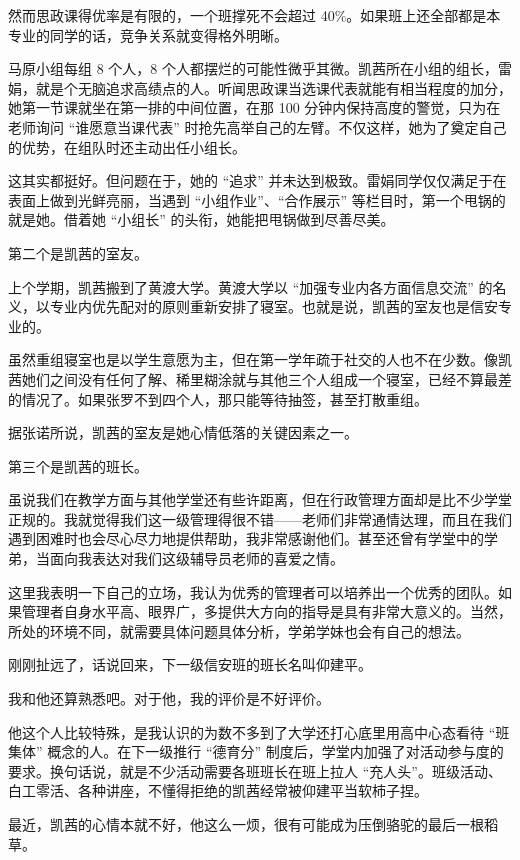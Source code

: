 \documentclass[UTF8]{ctexart}
\begin{document}
然而思政课得优率是有限的，一个班撑死不会超过 40\%。如果班上还全部都是本专业的同学的话，竞争关系就变得格外明晰。

马原小组每组 8 个人，8 个人都摆烂的可能性微乎其微。凯茜所在小组的组长，雷娟，就是个无脑追求高绩点的人。听闻思政课当选课代表就能有相当程度的加分，她第一节课就坐在第一排的中间位置，在那 100 分钟内保持高度的警觉，只为在老师询问 “谁愿意当课代表” 时抢先高举自己的左臂。不仅这样，她为了奠定自己的优势，在组队时还主动出任小组长。

这其实都挺好。但问题在于，她的 “追求” 并未达到极致。雷娟同学仅仅满足于在表面上做到光鲜亮丽，当遇到 “小组作业”、“合作展示” 等栏目时，第一个甩锅的就是她。借着她 “小组长” 的头衔，她能把甩锅做到尽善尽美。

第二个是凯茜的室友。

上个学期，凯茜搬到了黄渡大学。黄渡大学以 “加强专业内各方面信息交流” 的名义，以专业内优先配对的原则重新安排了寝室。也就是说，凯茜的室友也是信安专业的。

虽然重组寝室也是以学生意愿为主，但在第一学年疏于社交的人也不在少数。像凯茜她们之间没有任何了解、稀里糊涂就与其他三个人组成一个寝室，已经不算最差的情况了。如果张罗不到四个人，那只能等待抽签，甚至打散重组。

据张诺所说，凯茜的室友是她心情低落的关键因素之一。

第三个是凯茜的班长。

虽说我们在教学方面与其他学堂还有些许距离，但在行政管理方面却是比不少学堂正规的。我就觉得我们这一级管理得很不错——老师们非常通情达理，而且在我们遇到困难时也会尽心尽力地提供帮助，我非常感谢他们。甚至还曾有学堂中的学弟，当面向我表达对我们这级辅导员老师的喜爱之情。

这里我表明一下自己的立场，我认为优秀的管理者可以培养出一个优秀的团队。如果管理者自身水平高、眼界广，多提供大方向的指导是具有非常大意义的。当然，所处的环境不同，就需要具体问题具体分析，学弟学妹也会有自己的想法。

刚刚扯远了，话说回来，下一级信安班的班长名叫仰建平。

我和他还算熟悉吧。对于他，我的评价是不好评价。

他这个人比较特殊，是我认识的为数不多到了大学还打心底里用高中心态看待 “班集体” 概念的人。在下一级推行 “德育分” 制度后，学堂内加强了对活动参与度的要求。换句话说，就是不少活动需要各班班长在班上拉人 “充人头”。班级活动、白工零活、各种讲座，不懂得拒绝的凯茜经常被仰建平当软柿子捏。

最近，凯茜的心情本就不好，他这么一烦，很有可能成为压倒骆驼的最后一根稻草。

~\\
\end{document}
